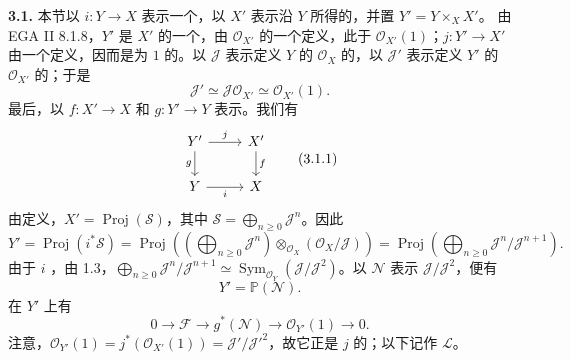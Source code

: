 \textbf{3.1.} 本节以 $i:Y\to X$ 表示一个，以 $X'$ 表示沿 $Y$ 所得的，并置 $Y'=Y\times_X X'$。
由 EGA II 8.1.8，$Y'$ 是 $X'$ 的一个，由 $\mathcal O_{X'}$ 的一个定义，此于 $\mathcal O_{X'}(1)$；$j:Y'\to X'$ 由一个定义，因而是为 $1$ 的。以 $\mathcal J$ 表示定义 $Y$ 的 $\mathcal O_X$ 的，以 $\mathcal J'$ 表示定义 $Y'$ 的 $\mathcal O_{X'}$ 的；于是
\[
\mathcal J'\simeq\mathcal J\mathcal O_{X'}\simeq\mathcal O_{X'}(1).
\]
最后，以 $f:X'\to X$ 和 $g:Y'\to Y$ 表示。我们有
\[
\begin{tikzcd}
Y'\arrow[r,"j"]\arrow[d,"g"']&X'\arrow[d,"f"]\\
Y\arrow[r,"i"']&X
\end{tikzcd}\tag{3.1.1}
\]
由定义，$X'=\operatorname{Proj}(\mathcal S)$，其中 $\mathcal S=\bigoplus_{n\geq0}\mathcal J^n$。因此
\[
Y'=\operatorname{Proj}(i^*\mathcal S)
=\operatorname{Proj}\left(\left(\bigoplus_{n\geq0}\mathcal J^n\right)\otimes_{\mathcal O_X}(\mathcal O_X/\mathcal J)\right)
=\operatorname{Proj}\left(\bigoplus_{n\geq0}\mathcal J^n/\mathcal J^{n+1}\right).
\]
由于 $i$ ，由 1.3，$\bigoplus_{n\geq0}\mathcal J^n/\mathcal J^{n+1}\simeq\operatorname{Sym}_{\mathcal O_Y}(\mathcal J/\mathcal J^2)$。以 $\mathcal N$ 表示 $\mathcal J/\mathcal J^2$，便有
\[
Y'=\mathbb P(\mathcal N).
\]
在 $Y'$ 上有
\[
0\longrightarrow\mathcal F\longrightarrow g^*(\mathcal N)\longrightarrow\mathcal O_{Y'}(1)\longrightarrow0.\tag{3.1.2}
\]
注意，$\mathcal O_{Y'}(1)=j^*(\mathcal O_{X'}(1))=\mathcal J'/\mathcal J'^2$，故它正是 $j$ 的；以下记作 $\mathcal L$。

